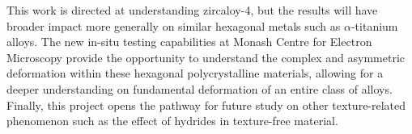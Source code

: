 This work is directed at understanding zircaloy-4, but the results will have broader impact more generally on similar hexagonal metals such as $\alpha$-titanium alloys.
The new in-situ testing capabilities at Monash Centre for Electron Microscopy provide the opportunity to understand the complex and asymmetric deformation within these hexagonal polycrystalline materials, allowing for a deeper understanding on fundamental deformation of an entire class of alloys.
Finally, this project opens the pathway for future study on other texture-related phenomenon such as the effect of hydrides in texture-free material.